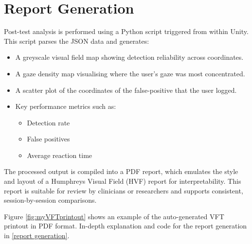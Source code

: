 \documentclass{l4proj}
\begin{document}
\section{Report Generation}
Post-test analysis is performed using a Python script triggered from within Unity. This script parses the JSON data and generates:

\begin{itemize}
    \item A greyscale visual field map showing detection reliability across coordinates.
 
    \item A gaze density map visualising where the user’s gaze was most concentrated.

    \item A scatter plot of the coordinates of the false-positive that the user logged. 
 
    \item Key performance metrics such as:
        \begin{itemize}
            \item Detection rate
         
            \item False positives
         
            \item Average reaction time
        \end{itemize}
\end{itemize}

The processed output is compiled into a PDF report, which emulates the style and layout of a Humphreys Visual Field (HVF) report for interpretability. This report is suitable for review by clinicians or researchers and supports consistent, session-by-session comparisons.

Figure \ref{fig:myVFTprintout} shows an example of the auto-generated VFT printout in PDF format.
In-depth explanation and code for the report generation in \ref{report generation}.
\end{document}
